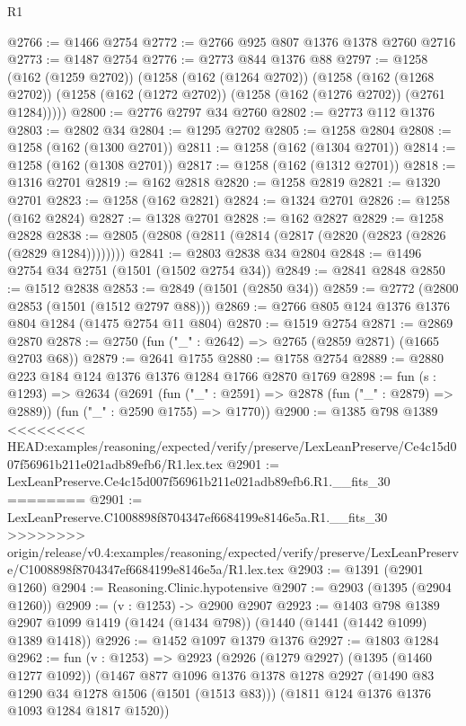 \begin{lexlean}{R1}
\begin{coremodule}
{{{{{{{{{{{{{{{{{{{{{{{{{{{{{{{{{{{{{{{{{{{{{{{{{{{{{{{{{{{{{{{{{{{{{{{{{{{{{{{{{{{{{{{{{{@2766 := @1466 @2754
@2772 := @2766 @925 @807 @1376 @1378 @2760 @2716
@2773 := @1487 @2754
@2776 := @2773 @844 @1376 @88
@2797 := @1258
    (@162 (@1259 @2702))
    (@1258
      (@162 (@1264 @2702))
      (@1258
        (@162 (@1268 @2702))
        (@1258 (@162 (@1272 @2702)) (@1258 (@162 (@1276 @2702)) (@2761 @1284)))))
@2800 := @2776 @2797 @34 @2760
@2802 := @2773 @112 @1376
@2803 := @2802 @34
@2804 := @1295 @2702
@2805 := @1258 @2804
@2808 := @1258 (@162 (@1300 @2701))
@2811 := @1258 (@162 (@1304 @2701))
@2814 := @1258 (@162 (@1308 @2701))
@2817 := @1258 (@162 (@1312 @2701))
@2818 := @1316 @2701
@2819 := @162 @2818
@2820 := @1258 @2819
@2821 := @1320 @2701
@2823 := @1258 (@162 @2821)
@2824 := @1324 @2701
@2826 := @1258 (@162 @2824)
@2827 := @1328 @2701
@2828 := @162 @2827
@2829 := @1258 @2828
@2838 := @2805 (@2808 (@2811 (@2814 (@2817 (@2820 (@2823 (@2826 (@2829 @1284))))))))
@2841 := @2803 @2838 @34 @2804
@2848 := @1496 @2754 @34 @2751 (@1501 (@1502 @2754 @34))
@2849 := @2841 @2848
@2850 := @1512 @2838
@2853 := @2849 (@1501 (@2850 @34))
@2859 := @2772 (@2800 @2853 (@1501 (@1512 @2797 @88)))
@2869 := @2766 @805 @124 @1376 @1376 @804 @1284 (@1475 @2754 @11 @804)
@2870 := @1519 @2754
@2871 := @2869 @2870
@2878 := @2750 (fun ("_" : @2642) => @2765 (@2859 @2871) (@1665 @2703 @68))
@2879 := @2641 @1755
@2880 := @1758 @2754
@2889 := @2880 @223 @184 @124 @1376 @1376 @1284 @1766 @2870 @1769
@2898 := fun (s : @1293) =>
  @2634
    (@2691
      (fun ("_" : @2591) => @2878 (fun ("_" : @2879) => @2889))
      (fun ("_" : @2590 @1755) => @1770))
@2900 := @1385 @798 @1389
<<<<<<<< HEAD:examples/reasoning/expected/verify/preserve/LexLeanPreserve/Ce4c15d007f56961b211e021adb89efb6/R1.lex.tex
@2901 := LexLeanPreserve.Ce4c15d007f56961b211e021adb89efb6.R1.__fits_30
========
@2901 := LexLeanPreserve.C1008898f8704347ef6684199e8146e5a.R1.__fits_30
>>>>>>>> origin/release/v0.4:examples/reasoning/expected/verify/preserve/LexLeanPreserve/C1008898f8704347ef6684199e8146e5a/R1.lex.tex
@2903 := @1391 (@2901 @1260)
@2904 := Reasoning.Clinic.hypotensive
@2907 := @2903 (@1395 (@2904 @1260))
@2909 := (v : @1253) -> @2900 @2907
@2923 := @1403
    @798
    @1389
    @2907
    @1099
    @1419
    (@1424 (@1434 @798))
    (@1440 (@1441 (@1442 @1099) @1389 @1418))
@2926 := @1452 @1097 @1379 @1376
@2927 := @1803 @1284
@2962 := fun (v : @1253) =>
  @2923
    (@2926
      (@1279 @2927)
      (@1395 (@1460 @1277 @1092))
      (@1467
        @877
        @1096
        @1376
        @1378
        @1278
        @2927
        (@1490 @83 @1290 @34 @1278 @1506 (@1501 (@1513 @83)))
        (@1811 @124 @1376 @1376 @1093 @1284 @1817 @1520))
}}}}}}}}}}}}}}}}}}}}}}}}}}}}}}}}}}}}}}}}}}}}}}}}}}}}}}}}}}}}}}}}}}}}}}}}}}}}}}}}}}}}}}}}}}
\end{coremodule}
\end{lexlean}

